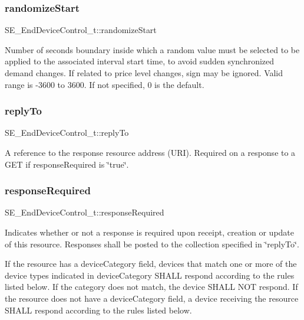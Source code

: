 \subsubsection{\texorpdfstring{randomize\+Start}{randomizeStart}}
{\footnotesize\ttfamily S\+E\+\_\+\+End\+Device\+Control\+\_\+t\+::randomize\+Start}

Number of seconds boundary inside which a random value must be selected to be applied to the associated interval start time, to avoid sudden synchronized demand changes. If related to price level changes, sign may be ignored. Valid range is -\/3600 to 3600. If not specified, 0 is the default. \mbox{\label{group__EndDeviceControl_ga5098e3ee0cbe07d0bb9821563911c00c}} 
\subsubsection{\texorpdfstring{reply\+To}{replyTo}}
{\footnotesize\ttfamily S\+E\+\_\+\+End\+Device\+Control\+\_\+t\+::reply\+To}

A reference to the response resource address (U\+RI). Required on a response to a G\+ET if response\+Required is \char`\"{}true\char`\"{}. \mbox{\label{group__EndDeviceControl_ga8bcd48a58db8fc4838ca0fa46fbfb5f6}} 
\subsubsection{\texorpdfstring{response\+Required}{responseRequired}}
{\footnotesize\ttfamily S\+E\+\_\+\+End\+Device\+Control\+\_\+t\+::response\+Required}

Indicates whether or not a response is required upon receipt, creation or update of this resource. Responses shall be posted to the collection specified in \char`\"{}reply\+To\char`\"{}.

If the resource has a device\+Category field, devices that match one or more of the device types indicated in device\+Category S\+H\+A\+LL respond according to the rules listed below. If the category does not match, the device S\+H\+A\+LL N\+OT respond. If the resource does not have a device\+Category field, a device receiving the resource S\+H\+A\+LL respond according to the rules listed below.

